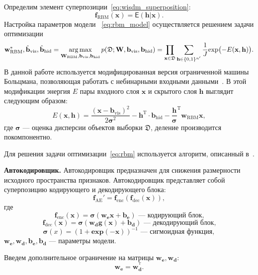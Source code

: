 Определим элемент суперпозиции~\eqref{eq:wisdm_superposition}: 
\begin{equation}
\label{eq:rbm_model}
\mathbf{f}_\text{RBM}(\mathbf{x}) = \mathsf{E}(\mathbf{h}|\mathbf{x}).
\end{equation}
Настройка параметров модели ~\eqref{eq:rbm_model} осуществляется решением задачи оптимизации
\begin{equation}
\label{eq:rbm}
{\mathbf{w}}^{*}_\text{RBM},\hat{\mathbf{b}}_\text{vis}, \hat{\mathbf{b}}_\text{hid} = \operatorname*{arg\,max}_{{\mathbf{W}_\text{RBM}},{\mathbf{b}}_\text{vis}, {\mathbf{b}}_\text{hid} } p(\mathfrak{D}; {\mathbf{W}},{\mathbf{b}_\text{vis}},{\mathbf{b}_\text{hid}}) = \prod_{\mathbf{x} \in \mathfrak{D}} \sum_{\mathbf{h}\in \{0,1\}^{n'}} \frac{1}{J} \text{exp}\bigl(-E(\mathbf{\mathbf{x}},\mathbf{h)}\bigr).
\end{equation}
В данной работе используется модифицированная версия ограниченной машины Больцмана, позволяющая работать с небинарными входными данными~\cite{gbrbm}. В этой модификации энергия $E$ пары входного слоя $\mathbf{x}$ и скрытого слоя $\mathbf{h}$ выглядит следующим образом:
\[
E(\mathbf{x},\mathbf{h}) = \frac{(\mathbf{x} - \mathbf{b}_\text{vis})^2}{2\boldsymbol{\sigma}^2} -\mathbf{h}^\text{T} \cdot \mathbf{b}_\text{hid} - \frac{\mathbf{h}}{\boldsymbol{\sigma}}^\text{T}\mathbf{w}_\text{RBM}\mathbf{x},
\]
где $\boldsymbol{\sigma}$ --- оценка дисперсии объектов выборки $\mathfrak{D}$, деление производится покомпонентно.

Для решения задачи оптимизации~\eqref{eq:rbm} используется алгоритм, описанный в~\cite{hinton_rbm}.

\textbf{Автокодировщик.}
Автокодировщик предназначен для снижения размерности исходного пространства признаков.
Автокодировщик представляет собой суперпозицию кодирующего и декодирующего блока:
\[
 \mathbf{f}_\text{AE}' = \mathbf{f}_\text{enc}(\mathbf{f}_\text{dec}(\mathbf{x})),
\]
где $$ \mathbf{f}_\text{enc}(\mathbf{x}) = \boldsymbol{\sigma}(\mathbf{w}_\textbf{e}\mathbf{x}+\mathbf{b}_\textbf{e}) \text{ --- кодирующий блок,}$$
$$  \mathbf{f}_\text{dec}(\mathbf{x}) = \boldsymbol{\sigma}(\mathbf{w}_\textbf{d}\mathbf{g}(\mathbf{x})+\mathbf{b}_\textbf{d})\text{ --- декодирующий блок,}$$ $$\boldsymbol{\sigma}(x) = (1+\textbf{exp}({-\mathbf{x}}))^{-1} \text{ --- сигмоидная функция},$$ $\mathbf{w}_\textbf{e},\mathbf{w}_\textbf{d},\mathbf{b}_\textbf{e}, \mathbf{b}_\textbf{d}$ --- параметры модели.

Введем дополнительное ограничение на матрицы $\mathbf{w}_\textbf{e}, \mathbf{w}_\textbf{d}$:
\[
 \mathbf{w}_\textbf{e} = \mathbf{w}_\textbf{d}^{^\text{T}}.
\]

